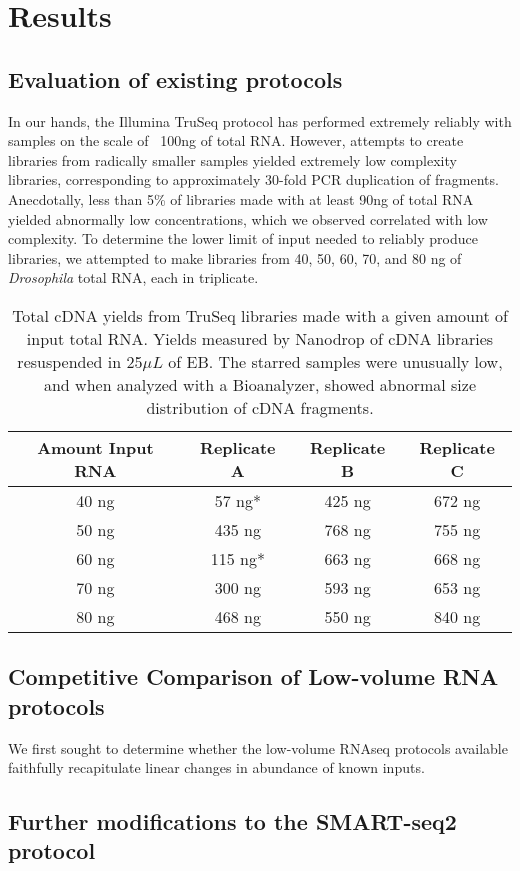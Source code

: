 \section{Results}


\subsection{Evaluation of existing protocols}


In our hands, the Illumina TruSeq protocol has performed extremely reliably with samples on the scale of ~100ng of total RNA.  However, attempts to create libraries from radically smaller samples yielded extremely low complexity libraries, corresponding to approximately 30-fold PCR duplication of fragments. Anecdotally, less than 5\% of libraries made with at least 90ng of total RNA yielded abnormally low concentrations, which we observed correlated with low complexity. To determine the lower limit of input needed to reliably produce libraries, we attempted to make libraries from 40, 50, 60, 70, and 80 ng of {\em Drosophila} total RNA, each in triplicate.


\begin{table}
\caption{Total cDNA yields from TruSeq libraries made with a given amount of input total RNA.  Yields measured by Nanodrop of cDNA libraries resuspended in 25$\mu L$ of EB. The starred samples were unusually low, and when analyzed with a Bioanalyzer, showed abnormal size distribution of cDNA fragments.}
\begin{center}
\begin{tabular}{|c|c|c|c|}\hline
Amount Input RNA & Replicate A & Replicate B & Replicate C\\\hline
40 ng &  57 ng*  & 425 ng & 672 ng\\
50 ng & 435 ng & 768 ng & 755 ng\\
60 ng & 115 ng* & 663 ng & 668 ng\\
70 ng & 300 ng & 593 ng & 653 ng\\
80 ng & 468 ng & 550 ng & 840 ng\\\hline
\end{tabular}
\end{center}
\label{default}
\end{table}


\subsection{Competitive Comparison of Low-volume RNA protocols}


We first sought to determine whether the low-volume RNAseq protocols available faithfully recapitulate linear changes in abundance of known inputs. 


\subsection{Further modifications to the SMART-seq2 protocol}
